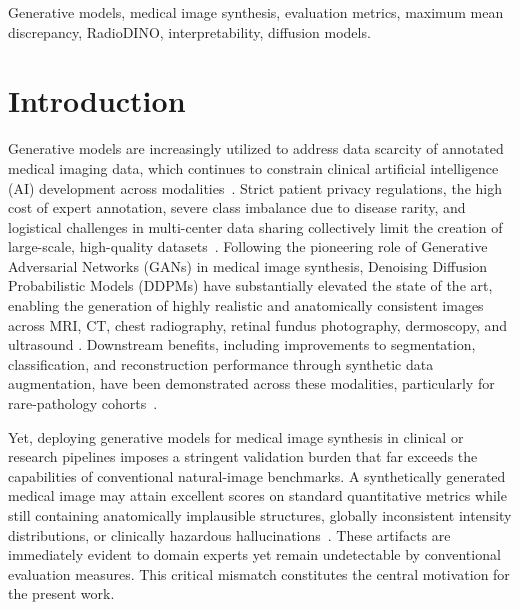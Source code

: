 \documentclass[lettersize,journal]{IEEEtran}
\begin{document}
\begin{IEEEkeywords}
Generative models, medical image synthesis, evaluation metrics,
maximum mean discrepancy, RadioDINO, interpretability, diffusion models.
\end{IEEEkeywords}

\section{Introduction}
\label{sec:introduction}


Generative models are increasingly utilized to address data scarcity of annotated medical imaging data, which
continues to constrain clinical artificial intelligence (AI)
development across modalities~\cite{kebaili2023deep, kazerouni2023diffusion}. Strict patient privacy regulations, the high cost of expert annotation, severe class imbalance due to disease rarity, and logistical challenges in multi-center data sharing collectively limit the creation of large-scale, high-quality datasets~\cite{finetti2025data, akpinar2024synthetic}. Following the pioneering role of Generative Adversarial Networks (GANs) \cite{goodfellow2014generative} in medical image synthesis, Denoising Diffusion Probabilistic Models
(DDPMs) \cite{ho2020denoising} have substantially elevated the state of the art, enabling the generation of highly realistic and anatomically consistent images across MRI, CT, chest radiography, retinal fundus photography, dermoscopy, and ultrasound \cite{kazerouni2023diffusion, khader2023denoising, pinaya2022brain}. Downstream benefits, including improvements to segmentation, classification, and reconstruction performance through synthetic data augmentation, have been demonstrated across these modalities, particularly for rare-pathology cohorts~\cite{finetti2025data, akpinar2024synthetic, kebaili2023deep}.

Yet, deploying generative models for medical image synthesis in
clinical or research pipelines imposes a stringent validation burden
that far exceeds the capabilities of conventional natural-image
benchmarks. A synthetically generated medical image may attain
excellent scores on standard quantitative metrics while still
containing anatomically implausible structures, globally inconsistent
intensity distributions, or clinically hazardous
hallucinations~\cite{kelkar2023assessing,deo2025metrics}. These
artifacts are immediately evident to domain experts yet remain
undetectable by conventional evaluation measures. This critical
mismatch constitutes the central motivation for the present work.
\end{document}
